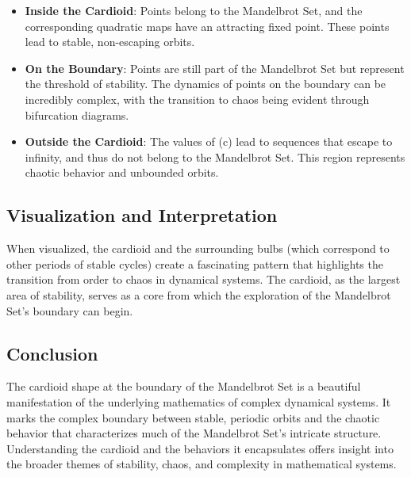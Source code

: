 \documentclass[
]{article}
\providecommand{\tightlist}{%
  \setlength{\itemsep}{0pt}\setlength{\parskip}{0pt}}
\def\tightlist{}
\begin{document}
\begin{itemize}
\tightlist
\item
  \textbf{Inside the Cardioid}: Points belong to the Mandelbrot Set, and
  the corresponding quadratic maps have an attracting fixed point. These
  points lead to stable, non-escaping orbits.
\item
  \textbf{On the Boundary}: Points are still part of the Mandelbrot Set
  but represent the threshold of stability. The dynamics of points on
  the boundary can be incredibly complex, with the transition to chaos
  being evident through bifurcation diagrams.
\item
  \textbf{Outside the Cardioid}: The values of (c) lead to sequences
  that escape to infinity, and thus do not belong to the Mandelbrot Set.
  This region represents chaotic behavior and unbounded orbits.
\end{itemize}

\subsection{Visualization and
Interpretation}\label{visualization-and-interpretation}

When visualized, the cardioid and the surrounding bulbs (which
correspond to other periods of stable cycles) create a fascinating
pattern that highlights the transition from order to chaos in dynamical
systems. The cardioid, as the largest area of stability, serves as a
core from which the exploration of the Mandelbrot Set's boundary can
begin.

\subsection{Conclusion}\label{conclusion-6}

The cardioid shape at the boundary of the Mandelbrot Set is a beautiful
manifestation of the underlying mathematics of complex dynamical
systems. It marks the complex boundary between stable, periodic orbits
and the chaotic behavior that characterizes much of the Mandelbrot Set's
intricate structure. Understanding the cardioid and the behaviors it
encapsulates offers insight into the broader themes of stability, chaos,
and complexity in mathematical systems.
\end{document}
